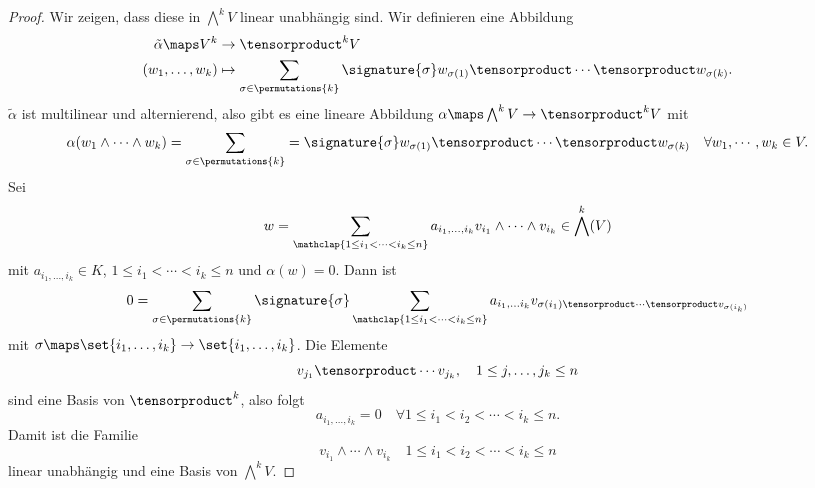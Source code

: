 \begin{proof}
  Wir zeigen, dass diese in \( \bigwedge^k V \) linear unabhängig sind. Wir definieren eine Abbildung
  \begin{align*}
    \tilde{\alpha}\maps V^k&\to \tensorproduct^k V\\
    (w_1,\dotsc,w_k)&\mapsto \sum_{\sigma\in \permutations{k}}\signature{\sigma}w_{\sigma(1)}\tensorproduct \dotsb \tensorproduct w_{\sigma(k)}.
  \end{align*}
  \( \tilde{\alpha} \) ist multilinear und alternierend, also gibt es eine lineare Abbildung \( \alpha\maps \bigwedge^k V\to \tensorproduct^k V \) mit 
  \begin{equation*}
    \alpha(w_1\wedge \dotsb \wedge w_k)=\sum_{\sigma\in \permutations{k}}=\signature{\sigma}w_{\sigma(1)}\tensorproduct \dotsb \tensorproduct w_{\sigma(k)}\quad \forall w_1,\dotsb,w_k\in V.
  \end{equation*}
  Sei
  \begin{equation*}
    w=\sum_{\mathclap{1\leq i_1<\dotsb<i_k\leq n}}a_{i_1,\dotsc,i_k}v_{i_1}\wedge \dotsb \wedge v_{i_k}\in \bigwedge^k(V)
  \end{equation*}
  mit \( a_{i_1,\dotsc,i_k}\in K \), \( 1\leq i_1<\dotsb<i_k\leq n \) und \( \alpha(w)=0 \). Dann ist
  \begin{equation*}
    0=\sum_{\sigma\in \permutations{k}}\signature{\sigma}\sum_{\mathclap{1\leq i_1<\dotsb <i_k\leq n}}a_{i_1,\dotsc i_k}v_{\sigma(i_1)\tensorproduct \dotsb \tensorproduct v_{\sigma(i_k)}}
  \end{equation*}
  mit \( \sigma\maps \set{i_1,\dotsc,i_k}\to \set{i_1,\dotsc,i_k} \). Die Elemente
  \begin{equation*}
    v_{j_1}\tensorproduct \dotsb v_{j_k},\quad 1\leq j,\dotsc,j_k\leq n
  \end{equation*}
  sind eine Basis von \( \tensorproduct^k  \), also folgt
  \begin{equation*}
    a_{i_1,\dotsc,i_k}=0\quad \forall 1\leq i_1<i_2<\dotsb<i_k\leq n.
  \end{equation*}
  Damit ist die Familie
  \begin{equation*}
    v_{i_1}\wedge \dotsb\wedge v_{i_k}\quad 1\leq i_1<i_2<\dotsb <i_k\leq n
  \end{equation*}
  linear unabhängig und eine Basis von \( \bigwedge^k V \).
  
\end{proof}
